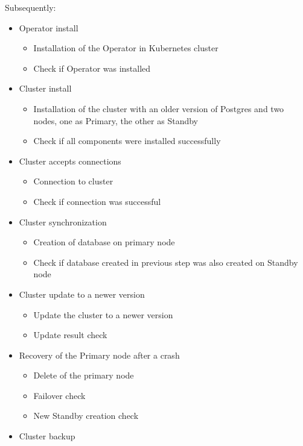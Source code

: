 Subsequently:
\begin{itemize}
  \item Operator install
        \begin{itemize}
          \item Installation of the Operator in Kubernetes cluster
          \item Check if Operator was installed
        \end{itemize}
  \item Cluster install
        \begin{itemize}
          \item Installation of the cluster with an older version of Postgres and two nodes, one as Primary, the other as Standby
          \item Check if all components were installed successfully
        \end{itemize}
  \item Cluster accepts connections
        \begin{itemize}
          \item Connection to cluster
          \item Check if connection was successful
        \end{itemize}
  \item Cluster synchronization
        \begin{itemize}
          \item Creation of database on primary node
          \item Check if database created in previous step was also created on Standby node
        \end{itemize}
  \item Cluster update to a newer version
        \begin{itemize}
          \item Update the cluster to a newer version
          \item Update result check
        \end{itemize}
  \item Recovery of the Primary node after a crash
        \begin{itemize}
          \item Delete of the primary node
          \item Failover check
          \item New Standby creation check
        \end{itemize}
  \item Cluster backup

\end{itemize}
